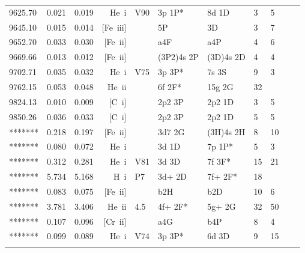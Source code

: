 \begin{longtable}{lrlrlllllll}
 9625.70 &   0.021 &   0.019 & He~{\sc i}       & V90        & 3p  1P*    & 8d  1D     &          3 &        5    \\
 9645.10 &   0.015 &   0.014 & [Fe~{\sc iii}]   &            & 5P         & 3D         &          3 &        7    \\
 9652.70 &   0.033 &   0.030 & [Fe~{\sc ii}]    &            & a4F        & a4P        &          4 &        6    \\
 9669.66 &   0.013 &   0.012 & [Fe~{\sc ii}]    &            & (3P2)4s 2P & (3D)4s 2D  &          4 &        4    \\
 9702.71 &   0.035 &   0.032 & He~{\sc i}       & V75        & 3p  3P*    & 7s  3S     &          9 &        3    \\
 9762.15 &   0.053 &   0.048 & He~{\sc ii}      &            & 6f  2F*    & 15g  2G    &         32 &             \\
 9824.13 &   0.010 &   0.009 & [C~{\sc i}]      &            & 2p2 3P     & 2p2 1D     &          3 &        5    \\
 9850.26 &   0.036 &   0.033 & [C~{\sc i}]      &            & 2p2 3P     & 2p2 1D     &          5 &        5    \\
 ******* &   0.218 &   0.197  & [Fe~{\sc ii}]   &            & 3d7 2G     & (3H)4s 2H  &          8 &       10    \\
 ******* &   0.080 &   0.072  & He~{\sc i}      &            & 3d  1D     & 7p  1P*    &          5 &        3    \\
 ******* &   0.312 &   0.281  & He~{\sc i}      & V81        & 3d  3D     & 7f  3F*    &         15 &       21    \\
 ******* &   5.734 &   5.168  & H~{\sc i}       & P7         & 3d+ 2D     & 7f+ 2F*    &         18 &             \\
 ******* &   0.083 &   0.075  & [Fe~{\sc ii}]   &            & b2H        & b2D        &         10 &        6    \\
 ******* &   3.781 &   3.406  & He~{\sc ii}     & 4.5        & 4f+ 2F*    & 5g+ 2G     &         32 &       50    \\
 ******* &   0.107 &   0.096  & [Cr~{\sc ii}]   &            & a4G        & b4P        &          8 &        4    \\
 ******* &   0.099 &   0.089  & He~{\sc i}      & V74        & 3p  3P*    & 6d  3D     &          9 &       15    \\
 \hline
 \label{tab:examples/ngc7009_cels.dat_linelist}
 \end{longtable}
